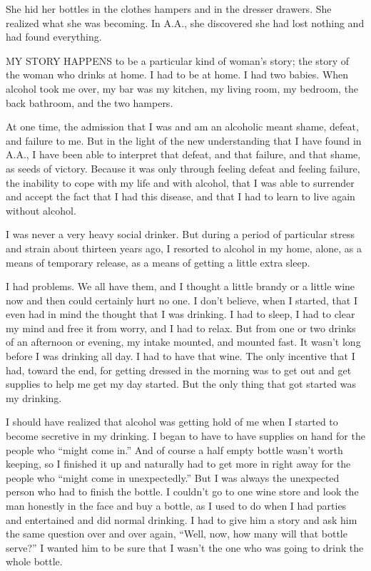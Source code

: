 
\bbChapterPreamble


\begin{biblechapter}
    She hid her bottles in the clothes hampers 
    and in the dresser drawers.
She realized what she was becoming.
In A.A., she discovered she had lost nothing
    and had found everything.
\end{biblechapter}


\begin{biblechapter}
    MY STORY HAPPENS to be a particular kind of woman’s story; 
    the story of the woman who drinks at home.
\verse I had to be at home.
\verse I had two babies.
\verse When alcohol took me over, 
    my bar was my kitchen, 
    my living room, my bedroom, 
    the back bathroom, and the two hampers.

\verse At one time, the admission that I was and am an alcoholic meant shame, defeat, and failure to me. But in the light of the new understanding that I have found in A.A., I have been able to interpret that defeat, and that failure, and that shame, as seeds of victory. Because it was only through feeling defeat and feeling failure, the inability to cope with my life and with alcohol, that I was able to surrender and accept the fact that I had this disease, and that I had to learn to live again without alcohol.

I was never a very heavy social drinker. But during a period of particular stress and strain about thirteen years ago, I resorted to alcohol in my home, alone, as a means of temporary release, as a means of getting a little extra sleep.

       I had problems. We all have them, and I thought a little brandy or a little wine now and then could certainly hurt no one. I don’t believe, when I started, that I even had in mind the thought that I was drinking. I had to sleep, I had to clear my mind and free it from worry, and I had to relax. But from one or two drinks of an afternoon or evening, my intake mounted, and mounted fast. It wasn’t long before I was drinking all day. I had to have that wine. The only incentive that I had, toward the end, for getting dressed in the morning was to get out and get supplies to help me get my day started. But the only thing that got started was my drinking.

I should have realized that alcohol was getting hold of me when I started to become secretive in my drinking. I began to have to have supplies on hand for the people who “might come in.” And of course a half empty bottle wasn’t worth keeping, so I finished it up and naturally had to get more in right away for the people who “might come in unexpectedly.” But I was always the unexpected person who had to finish the bottle. I couldn’t go to one wine store and look the man honestly in the face and buy a bottle, as I used to do when I had parties and entertained and did normal drinking. I had to give him a story and ask him the same question over and over again, “Well, now, how many will that bottle serve?” I wanted him to be sure that I wasn’t the one who was going to drink the whole bottle.


\end{biblechapter}
